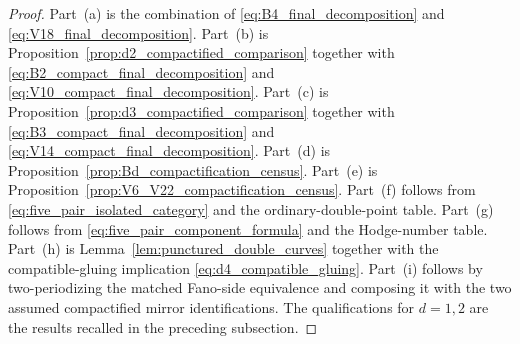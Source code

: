 \documentclass[11pt]{amsart}
\theoremstyle{definition}
\theoremstyle{remark}
\begin{document}
\begin{proof}
Part~\textup{(a)} is the combination of
\eqref{eq:B4_final_decomposition} and
\eqref{eq:V18_final_decomposition}.  Part~\textup{(b)} is
Proposition~\ref{prop:d2_compactified_comparison} together with
\eqref{eq:B2_compact_final_decomposition} and
\eqref{eq:V10_compact_final_decomposition}.  Part~\textup{(c)} is
Proposition~\ref{prop:d3_compactified_comparison} together with
\eqref{eq:B3_compact_final_decomposition} and
\eqref{eq:V14_compact_final_decomposition}.  Part~\textup{(d)} is
Proposition~\ref{prop:Bd_compactification_census}.  Part~\textup{(e)} is
Proposition~\ref{prop:V6_V22_compactification_census}.  Part~\textup{(f)}
follows from \eqref{eq:five_pair_isolated_category} and the
ordinary-double-point table.  Part~\textup{(g)} follows from
\eqref{eq:five_pair_component_formula} and the Hodge-number table.
Part~\textup{(h)} is Lemma~\ref{lem:punctured_double_curves} together with the
compatible-gluing implication \eqref{eq:d4_compatible_gluing}.  Part~\textup{(i)}
follows by two-periodizing the matched Fano-side equivalence and composing it
with the two assumed compactified mirror identifications.  The qualifications
for $d=1,2$ are the results recalled in the preceding subsection.
\end{proof}
\end{document}
